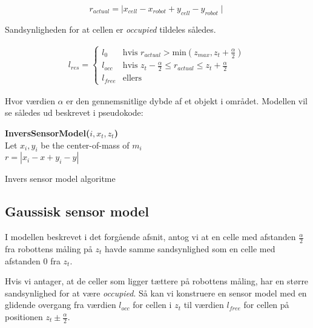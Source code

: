 \begin{equation}
r_{actual} = \mid x_{cell} - x_{robot} + y_{cell} - y_{robot} \mid
\end{equation}

Sandsynligheden for at cellen er  \emph{occupied} tildeles således.

\begin{equation}
\begin{split}
l_{res} = \begin{cases} 
	l_0 &\text{hvis }r_{actual} > \text{min}(z_{max},z_t+\frac{\alpha}{2}) \\ 
	l_{occ} &\text{hvis } z_t-\frac{\alpha}{2} \leq r_{actual} \leq z_t+\frac{\alpha}{2}\\ 
	l_{free} &\text{ellers}  
\end{cases}
\end{split}
\end{equation}

Hvor værdien $\alpha$ er den gennemsnitlige dybde af et objekt i området.
Modellen vil se således ud beskrevet i pseudokode:

\begin{algorithm}[H]
\textbf{InversSensorModel($i, x_t, z_t$)} \\
Let $x_i,y_i$ be the center-of-mass of $m_i$ \\
$r = |x_i - x + y_i - y|$ \\
\caption{Invers sensor model algoritme}
\label{alg:inversesensormodel}
\end{algorithm}

\subsection{Gaussisk sensor model}

I modellen beskrevet i det forgående afsnit, antog vi at en celle
med afstanden $\frac{\alpha}{2}$ fra robottens måling på $z_t$ havde
samme sandsynlighed som en celle med afstanden 0 fra $z_t$.

Hvis vi antager, at de celler som ligger tættere på robottens måling,
har en større sandsynlighed for at være \emph{occupied}. 
Så kan vi konstruere en sensor model med en glidende overgang fra værdien $l_{occ}$ for 
cellen i $z_t$ til værdien $l_{free}$ for cellen på positionen $z_t \pm \frac{\alpha}{2}$. 


